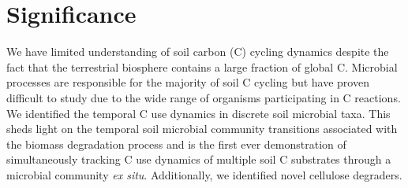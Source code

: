 \section{Significance} 
We have limited understanding of soil carbon (C) cycling dynamics despite the fact that the terrestrial biosphere contains a large fraction of global C. Microbial processes are responsible for the majority of soil C cycling but have proven difficult to study due to the wide range of organisms participating in C reactions. We identified the temporal C use dynamics in discrete soil microbial taxa. This sheds light on the temporal soil microbial community transitions associated with the biomass degradation process and is the first ever demonstration of simultaneously tracking C use dynamics of multiple soil C substrates through a microbial community \textit{ex situ}. Additionally, we identified novel cellulose degraders. 